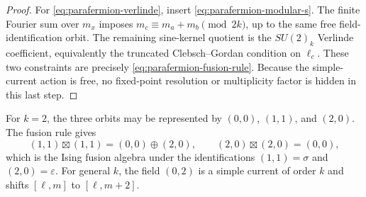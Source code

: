 \begin{proof}
For \eqref{eq:parafermion-verlinde}, insert
\eqref{eq:parafermion-modular-s}.  The finite Fourier sum over \(m_x\)
imposes \(m_c\equiv m_a+m_b\pmod{2k}\), up to the same free
field-identification orbit.  The remaining sine-kernel quotient is the
\(SU(2)_k\) Verlinde coefficient, equivalently the truncated Clebsch--Gordan
condition on \(\ell_c\).  These two constraints are precisely
\eqref{eq:parafermion-fusion-rule}.  Because the simple-current action is
free, no fixed-point resolution or multiplicity factor is hidden in this
last step.
\end{proof}

For \(k=2\), the three orbits may be represented by
\((0,0)\), \((1,1)\), and \((2,0)\).  The fusion rule gives
\[
  (1,1)\boxtimes(1,1)=(0,0)\oplus(2,0),
  \qquad
  (2,0)\boxtimes(2,0)=(0,0),
\]
which is the Ising fusion algebra under the identifications
\((1,1)=\sigma\) and \((2,0)=\varepsilon\).  For general \(k\), the field
\((0,2)\) is a simple current of order \(k\) and shifts
\([\ell,m]\) to \([\ell,m+2]\).

